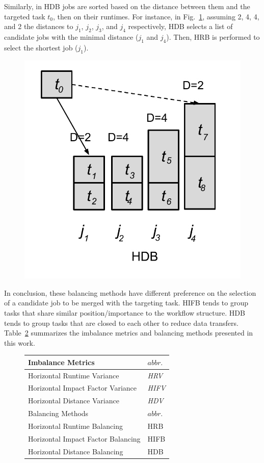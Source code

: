 Similarly, in HDB jobs are sorted based on the distance between them and the targeted task $t_0$, then on their runtimes. For instance, in Fig.~\ref{fig:algorithm_hdb}, assuming 2, 4, 4, and 2 the distances to $j_1$, $j_2$, $j_3$, and $j_4$ respectively, HDB selects a list of candidate jobs with the minimal distance ($j_1$ and $j_4$). Then, HRB is performed to select the shortest job ($j_1$). 

\begin{figure}[htb]
	\centering
	\includegraphics[width=0.5\linewidth]{figure/algorithm_hdb.pdf}
	\label{fig:algorithm_hdb}
	\vspace{-15pt}
\end{figure}

In conclusion, these balancing methods have different preference on the selection of a candidate job to be merged with the targeting task. HIFB tends to group tasks that share similar position/importance to the workflow structure. HDB tends to group tasks that are closed to each other to reduce data transfers. Table~\ref{tab:2} summarizes the imbalance metrics and balancing methods presented in this work. 

\begin{figure}[htb]
	\centering
	\begin{tabular}{l|l}
		\hline
		Imbalance Metrics & $abbr.$   \\
		\hline
		Horizontal Runtime Variance & \emph{HRV}   \\ 
		Horizontal Impact Factor Variance & \emph{HIFV} \\ 
		Horizontal Distance Variance & \emph{HDV}  \\ 
		\hline
		Balancing Methods & $abbr.$  \\
		\hline
		Horizontal Runtime Balancing & HRB   \\ 
		Horizontal Impact Factor Balancing & HIFB\\ 
		Horizontal Distance Balancing & HDB \\ 
		\hline
	\end{tabular}
	\label{tab:2}
	\vspace{-10pt}
\end{figure}



